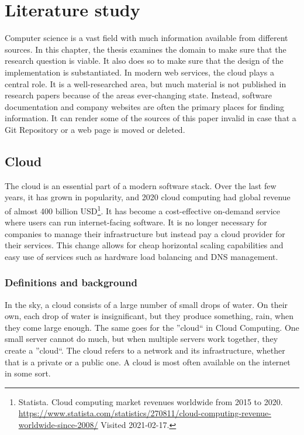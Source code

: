 \chapter{Literature study}
Computer science is a vast field with much information available from different sources. In this chapter, the thesis examines the domain to make sure that the research question is viable. It also does so to make sure that the design of the implementation is substantiated. In modern web services, the cloud plays a central role. It is a well-researched area, but much material is not published in research papers because of the areas ever-changing state. Instead, software documentation and company websites are often the primary places for finding information. It can render some of the sources of this paper invalid in case that a Git Repository or a web page is moved or deleted. 

\section{Cloud} %
The cloud is an essential part of a modern software stack. Over the last few years, it has grown in popularity, and 2020 cloud computing had global revenue of almost 400 billion USD\footnote{Statista. Cloud computing market revenues worldwide from 2015 to 2020. \url{https://www.statista.com/statistics/270811/cloud-computing-revenue-worldwide-since-2008/} Visited 2021-02-17.}. It has become a cost-effective on-demand service where users can run internet-facing software\cite{cloud_info}. It is no longer necessary for companies to manage their infrastructure but instead pay a cloud provider for their services. This change allows for cheap horizontal scaling capabilities and easy use of services such as hardware load balancing and DNS management.
\subsection{Definitions and background}
In the sky, a cloud consists of a large number of small drops of water. On their own, each drop of water is insignificant, but they produce something, rain, when they come large enough. The same goes for the ''cloud`` in Cloud Computing. One small server cannot do much, but when multiple servers work together, they create a ''cloud``\cite{whatiscloud}. The cloud refers to a network and its infrastructure, whether that is a private or a public one. A cloud is most often available on the internet in some sort. 

